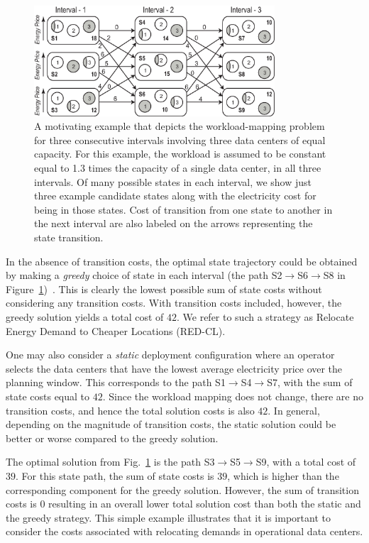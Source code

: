 \begin{figure}
\centering
\includegraphics[width=0.8\textwidth]{pics/ExampleTemplate3.eps}

\caption{A motivating example that depicts the workload-mapping
problem for three consecutive intervals involving three data
centers of equal capacity. For this example, the workload is
assumed to be constant equal to 1.3 times the capacity of a
single data center, in all three intervals. Of many possible
states in each interval, we show just three example candidate
states along with the electricity cost for being in those
states. Cost of transition from one state to another in the
next interval are also labeled on the arrows representing the
state transition.} \label{fig:mot-example}
\end{figure}

In the absence of transition costs, the optimal state
trajectory could be obtained by making a \emph{greedy} choice of state in
each
interval (the path S2$\rightarrow$S6$\rightarrow$S8 in Figure~\ref{fig:mot-example})~\cite{qureshiHotnets,qureshi2009cutting,rao2010}.
This is clearly the
lowest possible sum of state costs without considering any
transition costs.  
With transition costs included, however, the
greedy solution yields a total cost of $42$. We refer to such a strategy as Relocate Energy Demand to Cheaper
Locations (RED-CL). 

One may also consider a \emph{static} deployment configuration
where an operator selects the data centers that have the lowest
average electricity price over the planning window. This
corresponds to the path S1$\rightarrow$S4$\rightarrow$S7, with
the sum of state costs equal to $42$. Since the workload
mapping does not change, there are no transition costs, and
hence the total solution costs is also $42$. In general,
depending on the magnitude of transition costs, the static
solution could be better or worse compared to the greedy
solution.

The optimal solution from Fig.~\ref{fig:mot-example} is the
path S3$\rightarrow$S5$\rightarrow$S9, with a total cost of
$39$. For this state path, the sum of state costs is $39$,
which is higher than the corresponding component for the greedy
solution. However, the sum of transition costs is $0$ resulting
in an overall lower total solution cost than both the static and the 
greedy strategy. This simple example illustrates that it is
important to consider the costs associated with relocating
demands in operational data centers.

